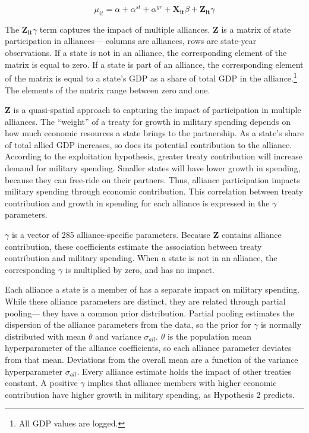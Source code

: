 \documentclass[12pt]{article}
\begin{document}
\begin{equation}
\mu_{it} = \alpha + \alpha^{st} + \alpha^{yr} + \mathbf{X_{it}} \beta + \mathbf{Z_{it}} \gamma 
\end{equation}


The $\mathbf{Z_{it}} \gamma$ term captures the impact of multiple alliances. 
\textbf{Z} is a matrix of state participation in alliances--- columns are alliances, rows are state-year observations. 
If a state is not in an alliance, the corresponding element of the matrix is equal to zero. 
If a state is part of an alliance, the corresponding element of the matrix is equal to a state's GDP as a share of total GDP in the alliance.\footnote{All GDP values are logged.} 
The elements of the matrix range between zero and one. 


\textbf{Z} is a quasi-spatial approach to capturing the impact of participation in multiple alliances.
The ``weight'' of a treaty for growth in military spending depends on how much economic resources a state brings to the partnership.  
As a state's share of total allied GDP increases, so does its potential contribution to the alliance.  
According to the exploitation hypothesis, greater treaty contribution will increase demand for military spending. 
Smaller states will have lower growth in spending, because they can free-ride on their partners.
Thus, alliance participation impacts military spending through economic contribution. 
This correlation between treaty contribution and growth in spending for each alliance is expressed in the $\gamma$ parameters. 


$\gamma$ is a vector of 285 alliance-specific parameters.  
Because \textbf{Z} contains alliance contribution, these coefficients estimate the association between treaty contribution and military spending. 
When a state is not in an alliance, the corresponding $\gamma$ is multiplied by zero, and has no impact. 


Each alliance a state is a member of has a separate impact on military spending.
While these alliance parameters are distinct, they are related through partial pooling--- they have a common prior distribution.
Partial pooling estimates the dispersion of the alliance parameters from the data, so the prior for $\gamma$ is normally distributed with mean $\theta$ and variance $\sigma_{all}$. 
$\theta$ is the population mean hyperparameter of the alliance coefficients, so each alliance parameter deviates from that mean.
Deviations from the overall mean are a function of the variance hyperparameter $\sigma_{all}$.
Every alliance estimate holds the impact of other treaties constant. 
A positive $\gamma$ implies that alliance members with higher economic contribution have higher growth in military spending, as Hypothesis 2 predicts. 
    
\end{document}
